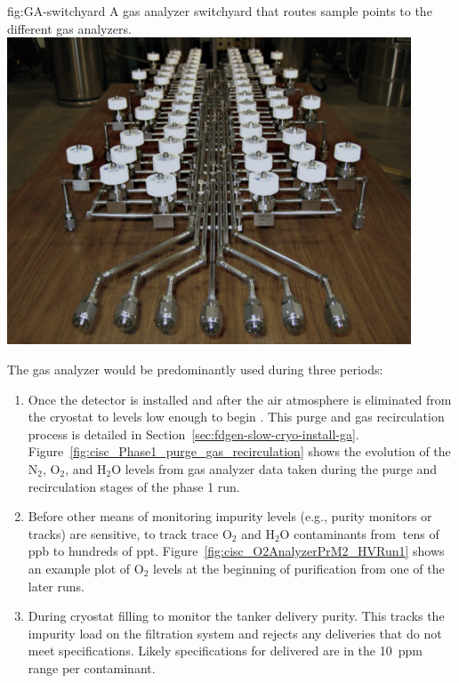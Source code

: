 \begin{dunefigure}{fig:GA-switchyard}
  {A gas analyzer switchyard that routes sample points to the different gas analyzers.}
  \includegraphics[width=0.9\textwidth]{graphics/cisc_GasAnalyzerSwitchyard.png}
\end{dunefigure}

The gas analyzer would be predominantly used during three periods: 


\begin{enumerate}
\item Once the detector is installed and after the air atmosphere is eliminated from the cryostat to levels low enough to begin \cooldown. This purge and gas recirculation process is detailed in Section~\ref{sec:fdgen-slow-cryo-install-ga}. Figure~\ref{fig:cisc_Phase1_purge_gas_recirculation} shows the evolution of the $\text{N}_2$, $\text{O}_2$, and $\text{H}_2\text{O}$ levels from gas analyzer data taken during the purge and recirculation stages of the   %
phase 1 run.


\item Before other means of monitoring impurity levels (e.g., purity monitors or  tracks) are sensitive, to track trace $\text{O}_2$ and $\text{H}_2\text{O}$ contaminants from $\>$tens of ppb to hundreds of ppt.  Figure~\ref{fig:cisc_O2AnalyzerPrM2_HVRun1} shows an example plot of $\text{O}_2$ levels at the beginning of \lar purification from one of the later   runs.

\item During cryostat filling to monitor the tanker \lar delivery purity. This tracks the impurity load on the filtration system and rejects any deliveries that do not meet specifications. Likely specifications for delivered \lar are in the \SI{10}{ppm} range per contaminant.


\end{enumerate}

